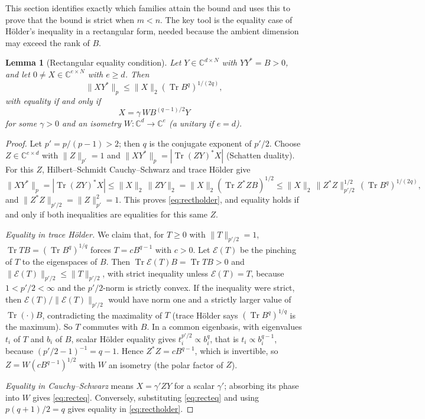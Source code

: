 \documentclass[11pt,a4paper]{article}
\numberwithin{equation}{section}
\newtheorem{lemma}[theorem]{Lemma}
\theoremstyle{definition}
\theoremstyle{remark}
\DeclareMathOperator{\Tr}{Tr}
\newcommand{\C}{\mathbb C}
\newcommand{\abs}[1]{\left\lvert #1\right\rvert}
\begin{document}
This section identifies exactly which families attain the bound and uses
this to prove that the bound is strict when \(m<n\). The key tool is the
equality case of Hölder's inequality in a rectangular form, needed
because the ambient dimension may exceed the rank of \(B\).

\begin{lemma}[Rectangular equality condition]\label{lem:holder}
Let \(Y\in\C^{d\times N}\) with \(YY^*=B>0\), and let
\(0\ne X\in\C^{e\times N}\) with \(e\ge d\). Then
\begin{equation}\label{eq:rectholder}
 \|XY^*\|_p\le\|X\|_2(\Tr B^q)^{1/(2q)},
\end{equation}
with equality if and only if
\begin{equation}\label{eq:recteq}
 X=\gamma\,WB^{(q-1)/2}Y
\end{equation}
for some \(\gamma>0\) and an isometry \(W:\C^d\to\C^e\) (a unitary if
\(e=d\)).
\end{lemma}

\begin{proof}
Let \(p'=p/(p-1)>2\); then \(q\) is the conjugate exponent of \(p'/2\).
Choose \(Z\in\C^{e\times d}\) with \(\|Z\|_{p'}=1\) and
\(\|XY^*\|_p=\abs{\Tr(ZY)^*X}\) (Schatten duality). For this \(Z\),
Hilbert--Schmidt Cauchy--Schwarz and trace Hölder give
\[
 \|XY^*\|_p=\abs{\Tr(ZY)^*X}\le\|X\|_2\,\|ZY\|_2
 =\|X\|_2(\Tr Z^*ZB)^{1/2}
 \le\|X\|_2\,\|Z^*Z\|_{p'/2}^{1/2}\,(\Tr B^q)^{1/(2q)},
\]
and \(\|Z^*Z\|_{p'/2}=\|Z\|_{p'}^2=1\). This proves \eqref{eq:rectholder},
and equality holds if and only if both inequalities are equalities for
this same \(Z\).

\emph{Equality in trace Hölder.} We claim that, for \(T\ge0\) with
\(\|T\|_{p'/2}=1\), \(\Tr TB=(\Tr B^q)^{1/q}\) forces
\(T=cB^{q-1}\) with \(c>0\). Let \(\mathcal E(T)\) be the pinching of
\(T\) to the eigenspaces of \(B\). Then \(\Tr\mathcal E(T)B=\Tr TB>0\) and
\(\|\mathcal E(T)\|_{p'/2}\le\|T\|_{p'/2}\), with strict inequality
unless \(\mathcal E(T)=T\), because \(1<p'/2<\infty\) and the
\(p'/2\)-norm is strictly convex. If the inequality were strict, then
\(\mathcal E(T)/\|\mathcal E(T)\|_{p'/2}\) would have norm one and a
strictly larger value of \(\Tr(\cdot)B\), contradicting the maximality of
\(T\) (trace Hölder says \((\Tr B^q)^{1/q}\) is the maximum). So \(T\)
commutes with \(B\). In a common eigenbasis, with eigenvalues \(t_i\) of
\(T\) and \(b_i\) of \(B\), scalar Hölder equality gives
\(t_i^{p'/2}\propto b_i^q\), that is \(t_i\propto b_i^{q-1}\), because
\((p'/2-1)^{-1}=q-1\). Hence \(Z^*Z=cB^{q-1}\), which is invertible, so
\(Z=W(cB^{q-1})^{1/2}\) with \(W\) an isometry (the polar factor of \(Z\)).

\emph{Equality in Cauchy--Schwarz} means \(X=\gamma' ZY\) for a scalar
\(\gamma'\); absorbing its phase into \(W\) gives \eqref{eq:recteq}.
Conversely, substituting \eqref{eq:recteq} and using \(p(q+1)/2=q\)
gives equality in \eqref{eq:rectholder}.
\end{proof}
\end{document}
